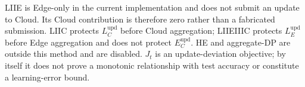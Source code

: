 LIIE is Edge-only in the current implementation and does not submit an update
to Cloud. Its Cloud contribution is therefore zero rather than a fabricated
submission. LIIC protects $L_C^{\mathrm{upd}}$ before Cloud aggregation;
LIIEIIIC protects $L_E^{\mathrm{upd}}$ before Edge aggregation and does not
protect $E_C^{\mathrm{upd}}$. HE and aggregate-DP are outside this method and
are disabled. $J_t$ is an update-deviation objective; by itself it does not
prove a monotonic relationship with test accuracy or constitute a learning-error
bound.
